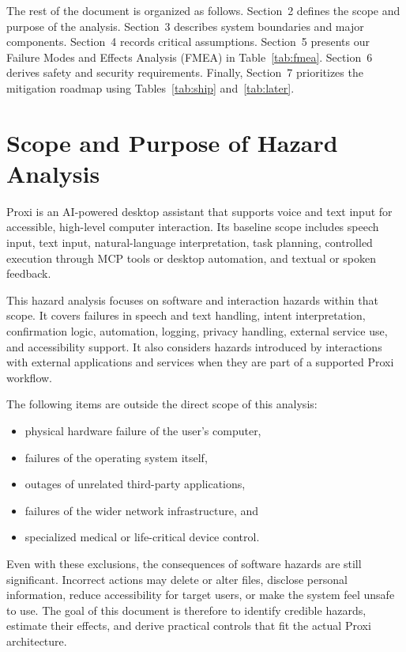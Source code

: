 \documentclass[12pt]{article}
\begin{document}
The rest of the document is organized as follows. Section~2 defines the
scope and purpose of the analysis. Section~3 describes system boundaries and
major components. Section~4 records critical assumptions. Section~5 presents
our Failure Modes and Effects Analysis (FMEA) in
Table~\ref{tab:fmea}. Section~6 derives safety and security requirements.
Finally, Section~7 prioritizes the mitigation roadmap using
Tables~\ref{tab:ship} and~\ref{tab:later}.

\section{Scope and Purpose of Hazard Analysis}

Proxi is an AI-powered desktop assistant that supports voice and text input
for accessible, high-level computer interaction. Its baseline scope includes
speech input, text input, natural-language interpretation, task planning,
controlled execution through MCP tools or desktop automation, and textual or
spoken feedback.

This hazard analysis focuses on software and interaction hazards within that
scope. It covers failures in speech and text handling, intent
interpretation, confirmation logic, automation, logging, privacy handling,
external service use, and accessibility support. It also considers hazards
introduced by interactions with external applications and services when they
are part of a supported Proxi workflow.

The following items are outside the direct scope of this analysis:
\begin{itemize}[noitemsep]
  \item physical hardware failure of the user's computer,
  \item failures of the operating system itself,
  \item outages of unrelated third-party applications,
  \item failures of the wider network infrastructure, and
  \item specialized medical or life-critical device control.
\end{itemize}

Even with these exclusions, the consequences of software hazards are still
significant. Incorrect actions may delete or alter files, disclose personal
information, reduce accessibility for target users, or make the system feel
unsafe to use. The goal of this document is therefore to identify credible
hazards, estimate their effects, and derive practical controls that fit the
actual Proxi architecture.
\end{document}
